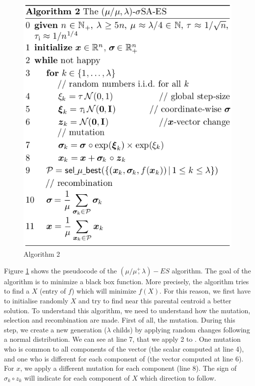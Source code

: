 \documentclass{article}
\begin{document}
\begin{figure}[H]
\begin{center} 
\includegraphics[scale=0.5]{figures/algo2.png}
\caption{Algorithm 2}
\label{algorithm2}
\end{center}
\end{figure}


Figure \ref{algorithm2} shows the pseudocode of the $(\mu / \mu \overset{+}{,} \lambda)-ES$ algorithm. The goal of the algorithm is to minimize a black box function. More precisely, the algorithm tries to find a $X$ (entry of $f$) which will minimize $f(X)$. For this reason, we first have to initialise randomly $X$ and try to find near this parental centroid a better solution.
To understand this algorithm, we need to understand how the mutation, selection and recombination are made.
First of all, the mutation. During this step, we create a new generation ($\lambda$ childs) by applying random changes following a normal distribution. We can see at line 7, that we apply 2 to \bm{$\sigma$}. One mutation who is common to all components of the vector (the scalar computed at line 4), and one who is different for each component of \bm{$\sigma$} (the vector computed at line 6). For $x$, we apply a different mutation for each component (line 8). The sign of $\sigma_{k} \circ z_{k}$ will indicate for each component of $X$ which direction to follow. 
\end{document}
